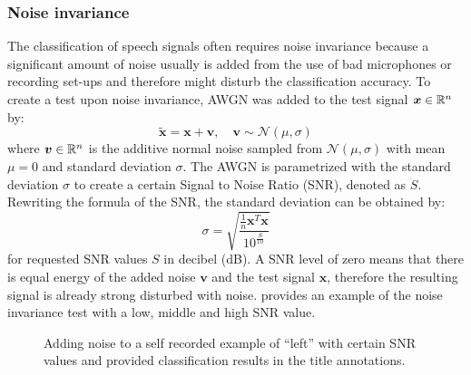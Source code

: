 \subsubsection{Noise invariance}
The classification of speech signals often requires noise invariance because a significant amount of noise usually is added from the use of bad microphones or recording set-ups and therefore might disturb the classification accuracy.
To create a test upon noise invariance, AWGN was added to the test signal $\bm{x} \in \mathbb{R}^n$ by:
\begin{equation}
  \bm{\tilde{x}} = \bm{x} + \bm{v}, \quad \bm{v} \sim \mathcal{N}(\mu, \sigma)
\end{equation}
where $\bm{v} \in \mathbb{R}^n$ is the additive normal noise sampled from $\mathcal{N}(\mu, \sigma)$ with mean $\mu = 0$ and standard deviation $\sigma$.
The AWGN is parametrized with the standard deviation $\sigma$ to create a certain Signal to Noise Ratio (SNR), denoted as $S$.
Rewriting the formula of the SNR, the standard deviation can be obtained by:
\begin{equation}
  \sigma = \sqrt{\frac{\frac{1}{n}\bm{x}^T \bm{x}}{10^{\frac{S}{10}}}}
\end{equation}
for requested SNR values $S$ in decibel (dB).
A SNR level of zero means that there is equal energy of the added noise $\bm{v}$ and the test signal $\bm{x}$, therefore the resulting signal is already strong disturbed with noise.
 provides an example of the noise invariance test with a low, middle and high SNR value.
\begin{figure}[!ht]
  \centering
  \caption{Adding noise to a self recorded example of \enquote{left} with certain SNR values and provided classification results in the title annotations.}
  \label{fig:exp_details_tb_noise_left}
\end{figure}
